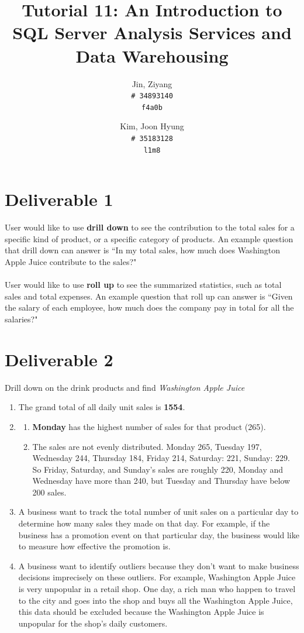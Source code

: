 \documentclass{article}
\title{Tutorial 11: An Introduction to SQL Server Analysis Services and Data Warehousing}
\author{
	Jin, Ziyang\\
	\texttt{\# 34893140}\\
	\texttt{f4a0b}
	\and
	Kim, Joon Hyung\\
	\texttt{\# 35183128}\\
	\texttt{l1m8}
}
\begin{document}
	\maketitle

\section{Deliverable 1}

User would like to use \textbf{drill down} to see the contribution to the total sales for a specific kind of product, or a specific category of products. An example question that drill down can answer is ``In my total sales, how much does Washington Apple Juice contribute to the sales?"\\
\\
User would like to use \textbf{roll up} to see the summarized statistics, such as total sales and total expenses. An example question that roll up can answer is ``Given the salary of each employee, how much does the company pay in total for all the salaries?"

\section{Deliverable 2}

Drill down on the drink products and find \textit{Washington Apple Juice}

\begin{enumerate}
	\item The grand total of all daily unit sales is \textbf{1554}.
	\item \begin{enumerate}
			\item \textbf{Monday} has the highest number of sales for that product (265).
			\item The sales are not evenly distributed. Monday 265, Tuesday 197, Wednesday 244, Thursday 184, Friday 214, Saturday: 221, Sunday: 229. So Friday, Saturday, and Sunday's sales are roughly 220, Monday and Wednesday have more than 240, but Tuesday and Thursday have below 200 sales.
		\end{enumerate}
	\item A business want to track the total number of unit sales on a particular day to determine how many sales they made on that day. For example, if the business has a promotion event on that particular day, the business would like to measure how effective the promotion is.
	\item A business want to identify outliers because they don't want to make business decisions imprecisely on these outliers. For example, Washington Apple Juice is very unpopular in a retail shop. One day, a rich man who happen to travel to the city and goes into the shop and buys all the Washington Apple Juice, this data should be excluded because the Washington Apple Juice is unpopular for the shop's daily customers.
\end{enumerate}
\end{document}
